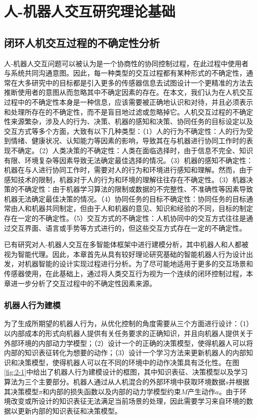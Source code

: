 \chapter{人-机器人交互研究理论基础}

\section{闭环人机交互过程的不确定性分析}
人-机器人交互问题可以被认为是一个协商性的协同控制过程，在此过程中使用者与系统共同沟通意图。因此，每一种类型的交互过程都有某种形式的不确定性，通常在大多研究中的目标都是引入更多的传感器信息去试图设计一个更精准的方法去推断使用者的意图从而忽略其中不确定因素的存在。在本文，我们认为在人机交互过程中的不确定性本身是一种信息，应该需要被正确地认识和对待，并且必须表示和处理所存在的不确定性，而不是盲目地过滤或忽略掉它。人机交互过程的不确定性来源繁杂，涉及人的行为、决策、机器的感知和决策、协同任务的目标设定以及交互方式等多个方面，大致有以下几种类型：（1）人的行为不确定性：人的行为受到情绪、健康状况、认知能力等因素的影响，导致其在与机器进行协同工作时的表现不确定。（2）人类决策的不确定性：人类在面临选择时，由于信息不完全、知识有限、环境复杂等因素导致无法确定最佳选择的情况。（3）机器的感知不确定性：机器在与人进行协同工作时，需要对人的行为和环境进行感知和理解。然而，由于感知技术的限制，机器对于人的行为和环境的理解往往存在不确定性。（3）机器决策的不确定性：由于机器学习算法的限制或数据的不完整性、不准确性等因素导致机器无法确定最佳决策的情况。（4）协同任务的目标不确定性：协同任务的目标通常由人和机器共同制定，但由于人和机器的意见、知识和经验的不同，目标的制定存在一定的不确定性。（5）交互方式的不确定性：人机协同中的交互方式往往是通过交互界面、语言或手势等方式进行的，但这些交互方式存在一定的不确定性。

已有研究对人-机器人交互在多智能体框架中进行建模分析，其中机器人和人都被视为智能代理\cite{liuDesigningRobotBehavior}。因此，本章首先从具有较好理论研究基础的智能机器人行为设计出发，对机器智能的设计实现过程进行分析。为了尽可能地适用于更多的交互场景和传感器使用，在此基础上，通过将人类交互行为视为一个连续的闭环控制过程，本章进一步分析了交互过程中的不确定性因素来源。

\subsection{机器人行为建模}
为了生成所期望的机器人行为，从优化控制的角度需要从三个方面进行设计\cite{liuDesigningRobotBehavior}：（1）以内部成本的形式向机器人提供有关任务要求的正确知识，并且向机器人提供关于外部环境的内部动力学模型；（2）设计一个的正确的决策模型，使得机器人可以将内部的知识表征转化为想要的动作；（3）设计一个学习方法来更新机器人的内部知识和决策模型，使得机器人可以在不同的环境中的动作决策具有泛化性。在图\ref{fig:2-1}中给出了机器人行为建模设计的框图，其中知识表征、决策模型以及学习算法为三个主要部分。机器人通过从人机混合的外部环境中获取环境数据$s$并根据其决策模型$\pi$和内部的损失函数以及内部的动力学模型约束$M$产生动作$a$。由于环境改变或所设计的知识表征无法满足当前场景的处理，因此需要学习来自环境的数据以更新内部的知识表征和决策模型。

